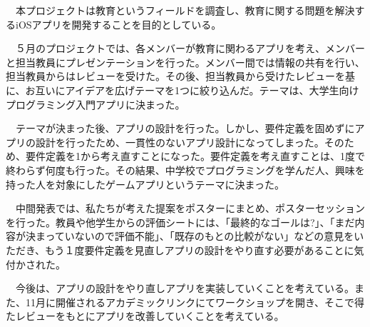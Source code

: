 \documentclass[openany,11pt,papersize]{jsbook}
\newcounter{hoge}
\newcommand{\fake}[1]{\whiledo{\thehoge<70}{#1\stepcounter{hoge}}%
  \setcounter{hoge}{0}}
\begin{document}
%
\maketitle

\frontmatter

\begin{jabstract} 
　本プロジェクトは教育というフィールドを調査し、教育に関する問題を解決するiOSアプリを開発することを目的としている。

　５月のプロジェクトでは、各メンバーが教育に関わるアプリを考え、メンバーと担当教員にプレゼンテーションを行った。メンバー間では情報の共有を行い、担当教員からはレビューを受けた。その後、担当教員から受けたレビューを基に、お互いにアイデアを広げテーマを1つに絞り込んだ。テーマは、大学生向けプログラミング入門アプリに決まった。

　テーマが決まった後、アプリの設計を行った。しかし、要件定義を固めずにアプリの設計を行ったため、一貫性のないアプリ設計になってしまった。そのため、要件定義を1から考え直すことになった。要件定義を考え直すことは、1度で終わらず何度も行った。その結果、中学校でプログラミングを学んだ人、興味を持った人を対象にしたゲームアプリというテーマに決まった。

　中間発表では、私たちが考えた提案をポスターにまとめ、ポスターセッションを行った。教員や他学生からの評価シートには、「最終的なゴールは?」、「まだ内容が決まっていないので評価不能」、「既存のもとの比較がない」などの意見をいただき、もう１度要件定義を見直しアプリの設計をやり直す必要があることに気付かされた。

　今後は、アプリの設計をやり直しアプリを実装していくことを考えている。また、11月に開催されるアカデミックリンクにてワークショップを開き、そこで得たレビューをもとにアプリを改善していくことを考えている。

\end{jabstract}
\end{document}
